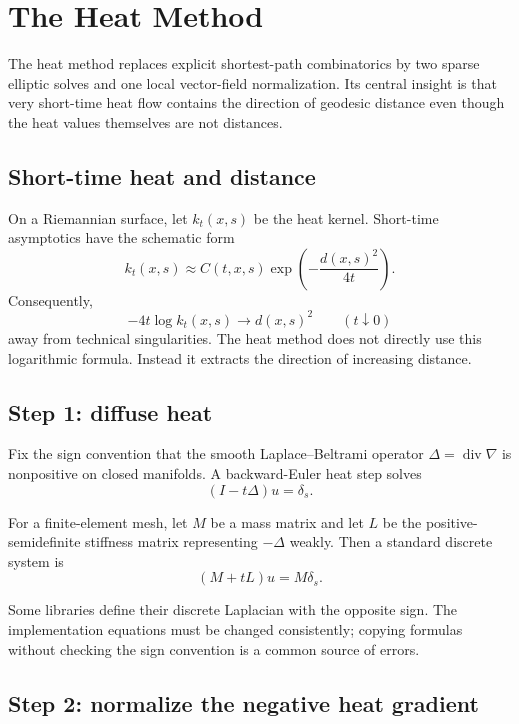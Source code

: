 \chapter{The Heat Method}
\label{ch:vii40}

The heat method replaces explicit shortest-path combinatorics by two sparse
elliptic solves and one local vector-field normalization.  Its central insight is
that very short-time heat flow contains the direction of geodesic distance even
though the heat values themselves are not distances.

\section{Short-time heat and distance}

On a Riemannian surface, let \(k_t(x,s)\) be the heat kernel.  Short-time
asymptotics have the schematic form
\[
k_t(x,s)\approx C(t,x,s)\exp\!\left(-\frac{d(x,s)^2}{4t}\right).
\]
Consequently,
\[
-4t\log k_t(x,s)\longrightarrow d(x,s)^2
\qquad (t\downarrow0)
\]
away from technical singularities.  The heat method does not directly use this
logarithmic formula.  Instead it extracts the direction of increasing distance.

\section{Step 1: diffuse heat}

Fix the sign convention that the smooth Laplace--Beltrami operator
\(\Delta=\operatorname{div}\nabla\) is nonpositive on closed manifolds.  A
backward-Euler heat step solves
\[
(I-t\Delta)u=\delta_s.
\]

For a finite-element mesh, let \(M\) be a mass matrix and let \(L\) be the
positive-semidefinite stiffness matrix representing \(-\Delta\) weakly.  Then a
standard discrete system is
\[
(M+tL)u=M\delta_s.
\]

\begin{remark}\label{rem:vii40-sign}
Some libraries define their discrete Laplacian with the opposite sign.  The
implementation equations must be changed consistently; copying formulas without
checking the sign convention is a common source of errors.
\end{remark}

\section{Step 2: normalize the negative heat gradient}

